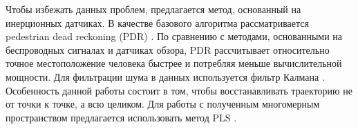 \documentclass[12pt,twoside]{article}
\begin{document}
Чтобы избежать данных проблем, предлагается метод, основанный на инерционных датчиках. В качестве базового алгоритма рассматривается pedestrian dead reckoning (PDR) \cite{7743695}. По сравнению с методами, основанными на беспроводных сигналах и датчиках обзора, PDR рассчитывает относительно точное местоположение человека быстрее и потребляя меньше вычислительной мощности. Для фильтрации шума в данных используется фильтр Калмана \cite{journals/corr/abs-1712-09004}. Особенность данной работы состоит в том, чтобы восстанавливать траекторию не от точки к точке, а всю целиком. Для работы с полученным многомерным пространством предлагается использовать метод PLS \cite{10.1007/11752790_2}.



\end{document}
